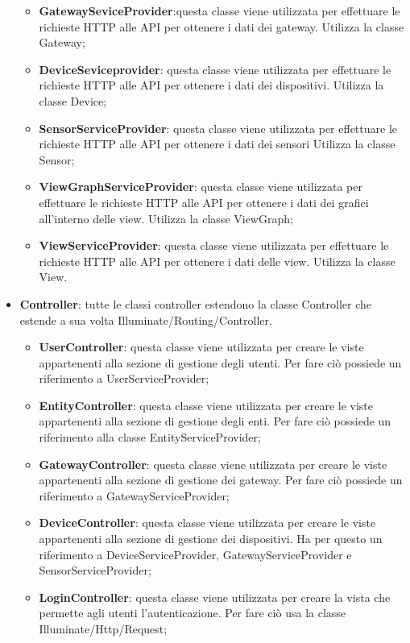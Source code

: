 \begin{itemize}
\begin{itemize}
			\item \textbf{GatewaySeviceProvider}:questa classe viene utilizzata per effettuare le richieste HTTP alle API per ottenere i dati dei gateway. Utilizza la classe Gateway;
			\item \textbf{DeviceSeviceprovider}: questa classe viene utilizzata per effettuare le richieste HTTP alle API per ottenere i dati dei dispositivi. Utilizza la classe Device;
			\item \textbf{SensorServiceProvider}: questa classe viene utilizzata per effettuare le richieste HTTP alle API per ottenere i dati dei sensori Utilizza la classe Sensor;
			\item \textbf{ViewGraphServiceProvider}: questa classe viene utilizzata per effettuare le richieste HTTP alle API per ottenere i dati dei grafici all'interno delle view. Utilizza la classe ViewGraph;
			\item \textbf{ViewServiceProvider}: questa classe viene utilizzata per effettuare le richieste HTTP alle API per ottenere i dati delle view. Utilizza la classe View.
		\end{itemize}
		\item \textbf{Controller}: tutte le classi controller estendono la classe Controller che estende a sua volta Illuminate/Routing/Controller.
		\begin{itemize}
			\item \textbf{UserController}: questa classe viene utilizzata per creare le viste appartenenti alla sezione di gestione degli utenti. Per fare ciò possiede un riferimento a UserServiceProvider; 
			\item \textbf{EntityController}: questa classe viene utilizzata per creare le viste appartenenti alla sezione di gestione degli enti. Per fare ciò possiede un riferimento alla classe EntityServiceProvider; 
			\item \textbf{GatewayController}: questa classe viene utilizzata per creare le viste appartenenti alla sezione di gestione dei gateway. Per fare ciò possiede un riferimento a GatewayServiceProvider; 
			\item \textbf{DeviceController}: questa classe viene utilizzata per creare le viste appartenenti alla sezione di gestione dei dispositivi. Ha per questo un riferimento a DeviceServiceProvider, GatewayServiceProvider e SensorServiceProvider;
			\item \textbf{LoginController}: questa classe viene utilizzata per creare la vista che permette agli utenti l'autenticazione. Per fare ciò usa la classe Illuminate/Http/Request; 

\end{itemize}
\end{itemize}
